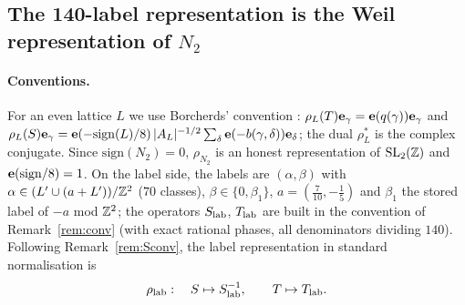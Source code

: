 \subsection{The 140-label representation is the Weil representation of $N_2$}\label{sec:weil}
\paragraph{Conventions.} For an even lattice $L$ we use Borcherds' convention \cite{Borcherds}: $\rho_L(T)\mathbf{e}_\gamma=\mathbf{e}(q(\gamma))\mathbf{e}_\gamma$ and $\rho_L(S)\mathbf{e}_\gamma=\mathbf{e}(-\mathrm{sign}(L)/8)\,|A_L|^{-1/2}\sum_\delta\mathbf{e}(-b(\gamma,\delta))\mathbf{e}_\delta$; the dual $\rho_L^*$ is the complex conjugate. Since $\mathrm{sign}(N_2)=0$, $\rho_{N_2}$ is an honest representation of $\mathrm{SL}_2(\mathbb{Z})$ and $\mathbf{e}(\mathrm{sign}/8)=1$. On the label side, the labels are $(\alpha,\beta)$ with $\alpha\in(L'\cup(a+L'))/\mathbb{Z}^2$ ($70$ classes), $\beta\in\{0,\beta_1\}$, $a=(\tfrac7{10},-\tfrac15)$ and $\beta_1$ the stored label of $-a$ mod $\mathbb{Z}^2$; the operators $S_{\rm lab}$, $T_{\rm lab}$ are built in the convention of Remark~\ref{rem:conv} (with exact rational phases, all denominators dividing $140$). Following Remark~\ref{rem:Sconv}, the label representation in standard normalisation is
\[
\rho_{\rm lab}:\quad S\mapsto S_{\rm lab}^{-1},\qquad T\mapsto T_{\rm lab}.
\]

